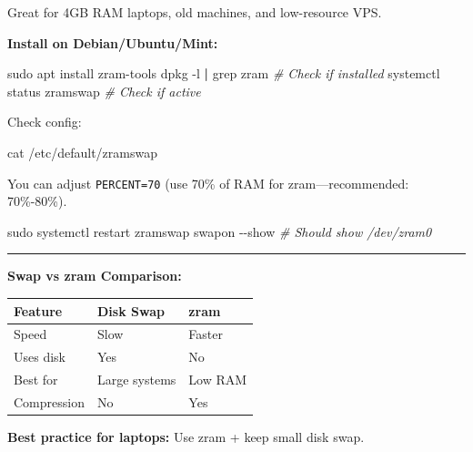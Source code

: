 \documentclass[
  english,
  paper=a4,
  oneside  ,captions=tableheading
]{scrartcl}
\newenvironment{Shaded}{}{}
\newcommand{\AttributeTok}[1]{\textcolor[rgb]{0.49,0.56,0.16}{#1}}
\newcommand{\CommentTok}[1]{\textcolor[rgb]{0.38,0.63,0.69}{\textit{#1}}}
\newcommand{\ExtensionTok}[1]{#1}
\newcommand{\FunctionTok}[1]{\textcolor[rgb]{0.02,0.16,0.49}{#1}}
\newcommand{\KeywordTok}[1]{\textcolor[rgb]{0.00,0.44,0.13}{\textbf{#1}}}
\newcommand{\NormalTok}[1]{#1}
\newcounter{none} %
\renewenvironment{quote}{\begin{customblockquote}\list{}{\rightmargin=0em\leftmargin=0em}%
\item\relax\color{blockquote-text}\ignorespaces}{\unskip\unskip\endlist\end{customblockquote}}
\begin{document}
Great for 4GB RAM laptops, old machines, and low-resource VPS.

\textbf{Install on Debian/Ubuntu/Mint:}

\begin{Shaded}
\begin{Highlighting}[]
\FunctionTok{sudo}\NormalTok{ apt install zram{-}tools}
\ExtensionTok{dpkg} \AttributeTok{{-}l} \KeywordTok{|} \FunctionTok{grep}\NormalTok{ zram              }\CommentTok{\# Check if installed}
\ExtensionTok{systemctl}\NormalTok{ status zramswap        }\CommentTok{\# Check if active}
\end{Highlighting}
\end{Shaded}

Check config:

\begin{Shaded}
\begin{Highlighting}[]
\FunctionTok{cat}\NormalTok{ /etc/default/zramswap}
\end{Highlighting}
\end{Shaded}

You can adjust \texttt{PERCENT=70} (use 70\% of RAM for
zram---recommended: 70\%-80\%).

\begin{Shaded}
\begin{Highlighting}[]
\FunctionTok{sudo}\NormalTok{ systemctl restart zramswap}
\ExtensionTok{swapon} \AttributeTok{{-}{-}show}                    \CommentTok{\# Should show /dev/zram0}
\end{Highlighting}
\end{Shaded}

\begin{center}\rule{0.5\linewidth}{0.5pt}\end{center}

\textbf{Swap vs zram Comparison:}

{\def\LTcaptype{none} %
\begin{longtable}[]{@{}lll@{}}
\toprule\noalign{}
Feature & Disk Swap & zram \\
\midrule\noalign{}
\endhead
\bottomrule\noalign{}
\endlastfoot
Speed & Slow & Faster \\
Uses disk & Yes & No \\
Best for & Large systems & Low RAM \\
Compression & No & Yes \\
\end{longtable}
}

\begin{quote}
\textbf{Best practice for laptops:} Use zram + keep small disk swap.
\end{quote}
\end{document}
